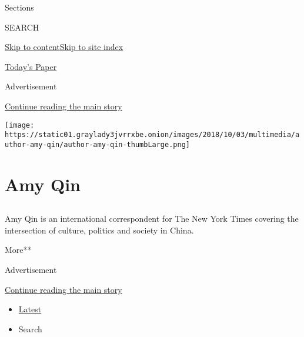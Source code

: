 Sections

SEARCH

\protect\hyperlink{site-content}{Skip to
content}\protect\hyperlink{site-index}{Skip to site index}

\href{https://myaccount.nytimes3xbfgragh.onion/auth/login?response_type=cookie\&client_id=vi}{}

\href{https://www.nytimes3xbfgragh.onion/section/todayspaper}{Today's
Paper}

Advertisement

\protect\hyperlink{after-top}{Continue reading the main story}

\texttt{[image: https://static01.graylady3jvrrxbe.onion/images/2018/10/03/multimedia/author-amy-qin/author-amy-qin-thumbLarge.png]}

\hypertarget{amy-qin}{%
\section{Amy Qin}\label{amy-qin}}

\subsection{}

Amy Qin is an international correspondent for The New York Times
covering the intersection of culture, politics and society in China.

More**

Advertisement

\protect\hyperlink{after-mid1}{Continue reading the main story}

\begin{itemize}
\tightlist
\item
  \protect\hyperlink{stream-panel}{Latest}
\item
  Search
\end{itemize}

